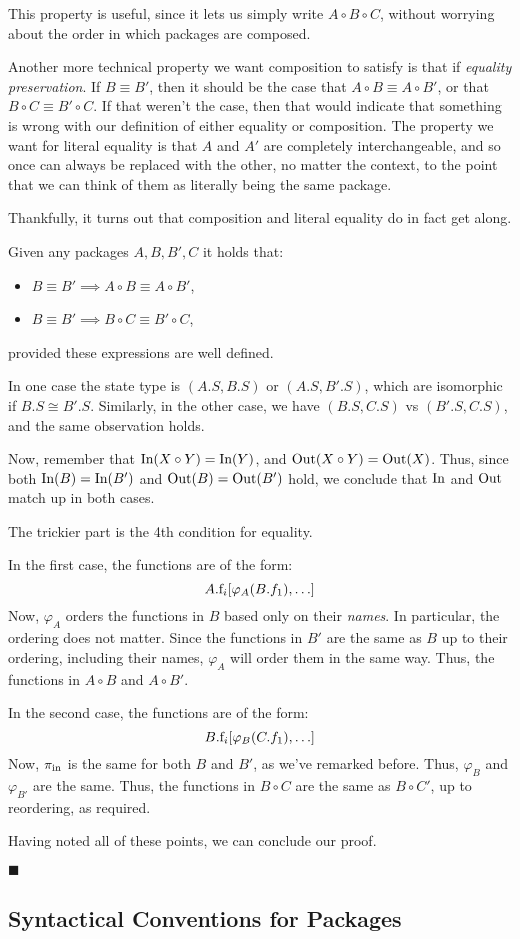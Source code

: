 This property is useful, since it lets us simply write $A \circ B \circ C$,
without worrying about the order in which packages are composed.

Another more technical property we want composition to satisfy is
that if \emph{equality preservation}.
If $B \equiv B'$, then it should be the case that $A \circ B \equiv A \circ B'$,
or that $B \circ C \equiv B' \circ C$.
If that weren't the case, then that would indicate that something is wrong
with our definition of either equality or composition.
The property we want for literal equality is that $A$ and $A'$ are completely
interchangeable, and so once can always be replaced with the other, no matter
the context, to the point that we can think of them as literally being the same
package.

Thankfully, it turns out that composition and literal equality do
in fact get along.

\begin{lemma}
    Given any packages $A, B, B', C$ it holds that:
    \begin{itemize}
        \item $B \equiv B' \implies A \circ B \equiv A \circ B'$,
        \item $B \equiv B' \implies B \circ C \equiv B' \circ C$,
    \end{itemize}
    provided these expressions are well defined.

     In one case the state type is $(A.S, B.S)$
    or $(A.S, B'.S)$, which are isomorphic if $B.S \cong B'.S$.
    Similarly, in the other case, we have $(B.S, C.S)$ vs $(B'.S, C.S)$,
    and the same observation holds.

    Now, remember that $\text{In}(X \circ Y) = \text{In}(Y)$, and $\text{Out}(X \circ Y) = \text{Out}(X)$.
    Thus, since both $\text{In}(B) = \text{In}(B')$ and $\text{Out}(B) = \text{Out}(B')$
    hold, we conclude that $\text{In}$ and $\text{Out}$ match up in both cases.

    The trickier part is the 4th condition for equality.

    In the first case, the functions are of the form:
    $$
    A.\text{f}_i[\varphi_A(B.f_1), \ldots]
    $$
    Now, $\varphi_A$ orders the functions in $B$ based only on their \emph{names}.
    In particular, the ordering does not matter.
    Since the functions in $B'$ are the same as $B$ up to their ordering,
    including their names,
    $\varphi_A$ will order them in the same way.
    Thus, the functions in $A \circ B$ and $A \circ B'$.

    In the second case, the functions are of the form:
    $$
    B.\text{f}_i[\varphi_B(C.f_1), \ldots]
    $$
    Now, $\pi_{\text{in}}$ is the same for both $B$ and $B'$, as we've remarked
    before.
    Thus, $\varphi_B$ and $\varphi_{B'}$ are the same.
    Thus, the functions in $B \circ C$ are the same as $B \circ C'$,
    up to reordering, as required.

    Having noted all of these points, we can conclude our proof.

    $\blacksquare$
\end{lemma}

\subsection{Syntactical Conventions for Packages}